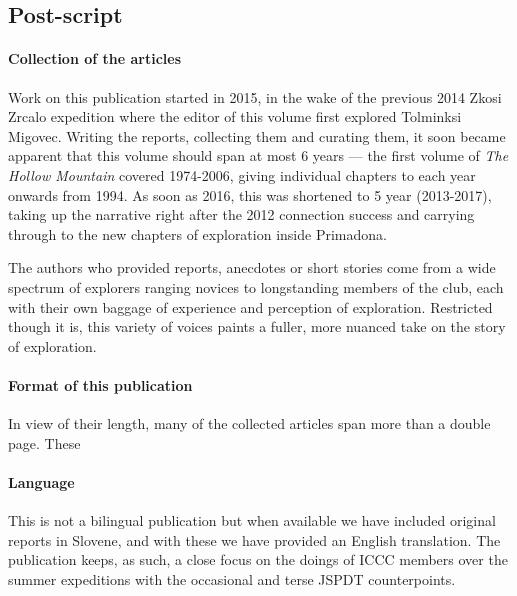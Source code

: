 \newpage
 
 \begin{tcolorbox}
 	\begin{fullwidth}
 	\section{Post-script}
 		\begin{multicols}{2}


 			\paragraph{Collection of the articles}

 			Work on this publication started in 2015, in the wake of the previous 2014 Zkosi Zrcalo expedition where the editor of this volume first explored Tolminksi Migovec. Writing the reports, collecting them and curating them, it soon became apparent that this volume should span at most 6 years --- the first volume of \emph{The Hollow Mountain} covered 1974-2006, giving individual chapters to each year onwards from 1994. As soon as 2016, this was shortened to 5 year (2013-2017), taking up the narrative right after the 2012 connection success and carrying through to the new chapters of exploration inside Primadona.


 			The authors who provided reports, anecdotes or short stories come from a wide spectrum of explorers ranging novices to longstanding members of the club, each with their own baggage of experience and perception of exploration. Restricted though it is, this variety of voices paints a fuller, more nuanced take on the story of exploration.

 			\paragraph{Format of this publication}

 			In view of their length, many of the collected articles span more than a double page. These 


 			\paragraph{Language}

 			This is not a bilingual publication but when available we have included original reports in Slovene, and with these we have provided an English translation. The publication keeps, as such, a close focus on the doings of ICCC members over the summer expeditions with the occasional and terse JSPDT counterpoints. 



\end{multicols}
\end{fullwidth}
\end{tcolorbox}
